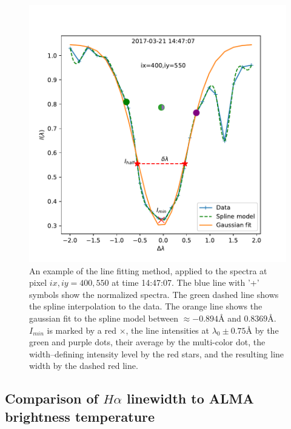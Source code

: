 \documentclass[twocolumn]{aastex62}
\newcommand{\halpha}{\ensuremath{H\alpha}}
\newcommand{\linecenter}{\ensuremath{\lambda_0}}
\newcommand{\imin}{\ensuremath{I_\mathit{min}}}
\begin{document}
\begin{figure}
    \centering
    \includegraphics[width=\linewidth]{figures/line-fit-example-figure.pdf}
    \caption{An example of the line fitting method, applied to the spectra at pixel $ix,iy=400,550$ at time 14:47:07.  The blue line with '+' symbols show the normalized spectra.  The green dashed line shows the spline interpolation to the data.  The orange line shows the gaussian fit to the spline model between $\approx-0.894$\AA{} and $0.8369$\AA{}.  \imin{} is marked by a red $\times$, the line intensities at $\linecenter\pm0.75$\AA{} by the green and purple dots, their average by the multi-color dot, the width--defining intensity level by the red stars, and the resulting line width by the dashed red line.}
    \label{fig:linefitexample}
\end{figure}

\subsection{Comparison of \halpha{} linewidth to ALMA brightness temperature}
\end{document}
